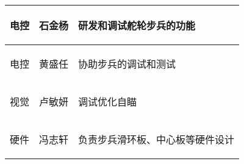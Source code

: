 \begin{longtable}{ p{2cm} | p{3.5cm} | p{9.3cm} |}
    \hline

        \begin{center}
            电控
        \end{center}&
        \begin{center}
            石金杨
        \end{center}&
        \begin{center}
            研发和调试舵轮步兵的功能
        \end{center}\\
        
    \hline

        \begin{center}
            电控
        \end{center}&
        \begin{center}
            黄盛任
        \end{center}&
        \begin{center}
            协助步兵的调试和测试
        \end{center}\\

    \hline

        \begin{center}
            视觉
        \end{center}&
        \begin{center}
            卢敏妍
        \end{center}&
        \begin{center}
            调试优化自瞄
        \end{center}\\

    \hline

        \begin{center}
            硬件
        \end{center}&
        \begin{center}
            冯志轩
        \end{center}&
        \begin{center}
            负责步兵滑环板、中心板等硬件设计
        \end{center}\\
    
\end{longtable}
